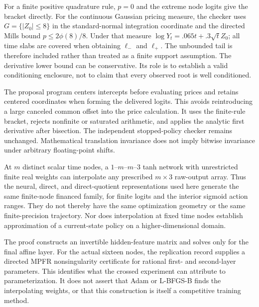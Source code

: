 For a finite positive quadrature rule, $p=0$ and the extreme node logits give the bracket directly. For the continuous Gaussian pricing measure, the checker uses $G=\{|Z_0|\leq8\}$ in the standard-normal integration coordinate and the directed Mills bound $p\leq2\phi(8)/8$. Under that measure $\log Y_t=.065t+.3\sqrt t Z_0$; all time slabs are covered when obtaining $\ell_-$ and $\ell_+$. The unbounded tail is therefore included rather than treated as a finite support assumption. The derivative lower bound can be conservative. Its role is to establish a valid conditioning enclosure, not to claim that every observed root is well conditioned.

The proposal program centers intercepts before evaluating prices and retains centered coordinates when forming the delivered logits. This avoids reintroducing a large canceled common offset into the price calculation. It uses the finite-rule bracket, rejects nonfinite or saturated arithmetic, and applies the analytic first derivative after bisection. The independent stopped-policy checker remains unchanged. Mathematical translation invariance does not imply bitwise invariance under arbitrary floating-point shifts.

\begin{proposition}\label{prop:r23class}
At $m$ distinct scalar time nodes, a $1$--$m$--$m$--$3$ tanh network with unrestricted finite real weights can interpolate any prescribed $m\times3$ raw-output array. Thus the neural, direct, and direct-quotient representations used here generate the same finite-node financed family, for finite logits and the interior sigmoid action ranges. They do not thereby have the same optimization geometry or the same finite-precision trajectory. Nor does interpolation at fixed time nodes establish approximation of a current-state policy on a higher-dimensional domain.
\end{proposition}

The proof constructs an invertible hidden-feature matrix and solves only for the final affine layer. For the actual sixteen nodes, the replication record supplies a directed MPFR nonsingularity certificate for rational first- and second-layer parameters. This identifies what the crossed experiment can attribute to parameterization. It does not assert that Adam or L-BFGS-B finds the interpolating weights, or that this construction is itself a competitive training method.

